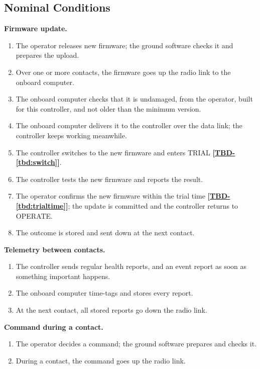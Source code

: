 \documentclass[11pt,a4paper]{article}
\newcommand{\tbd}[1]{\mbox{\textbf{[\hyperref[tbd:#1]{TBD-\ref*{tbd:#1}}]}}}
\begin{document}
\subsection{Nominal Conditions}
\begin{description}[leftmargin=3cm]
\item[Scenario-100] \textbf{Firmware update.}
  \begin{enumerate}[nosep]
  \item The operator releases new firmware; the ground software checks it and
    prepares the upload.
  \item Over one or more contacts, the firmware goes up the radio link to the
    onboard computer.
  \item The onboard computer checks that it is undamaged, from the operator,
    built for this controller, and not older than the minimum version.
  \item The onboard computer delivers it to the controller over the data link;
    the controller keeps working meanwhile.
  \item The controller switches to the new firmware and enters TRIAL
    \tbd{switch}.
  \item The controller tests the new firmware and reports the result.
  \item The operator confirms the new firmware within the trial time
    \tbd{trialtime}; the update is committed and the controller returns to
    OPERATE.
  \item The outcome is stored and sent down at the next contact.
  \end{enumerate}
\item[Scenario-110] \textbf{Telemetry between contacts.}
  \begin{enumerate}[nosep]
  \item The controller sends regular health reports, and an event report as
    soon as something important happens.
  \item The onboard computer time-tags and stores every report.
  \item At the next contact, all stored reports go down the radio link.
  \end{enumerate}
\item[Scenario-120] \textbf{Command during a contact.}
  \begin{enumerate}[nosep]
  \item The operator decides a command; the ground software prepares and
    checks it.
  \item During a contact, the command goes up the radio link.

\end{enumerate}
\end{description}
\end{document}
